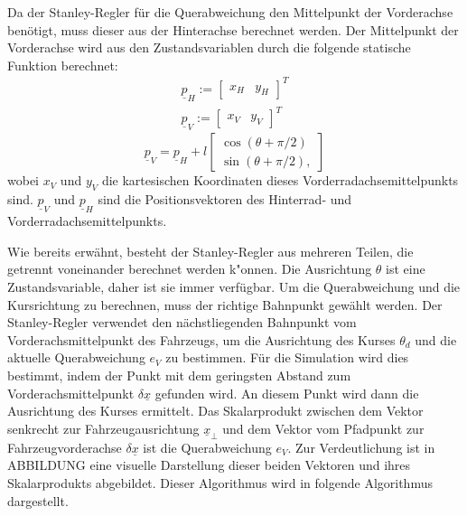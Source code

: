 \documentclass[arbeit=studie,oneside,BCOR=12mm]{ArbeitRST}
\begin{document}
Da der Stanley-Regler für die Querabweichung den Mittelpunkt der Vorderachse
benötigt, muss dieser aus der Hinterachse berechnet werden. Der Mittelpunkt der
Vorderachse wird aus den Zustandsvariablen durch die folgende statische
Funktion berechnet: 
\begin{gather}
  \underline{p}_H := 
  \begin{bmatrix}
    x_H & y_H
  \end{bmatrix}^T \\
  \underline{p}_V := 
  \begin{bmatrix}
    x_V & y_V
  \end{bmatrix}^T
  \label{eq:Rear Axle and Front Axle}
\end{gather}
\begin{equation}
  \underline{p}_V = \underline{p}_H + l 
  \begin{bmatrix}
    \cos(\theta + \pi/2) \\ 
    \sin(\theta + \pi/2),
  \end{bmatrix}
  \label{eq:Transformation from Rear Axle to Front Axle}
\end{equation}
wobei $x_V$ und $y_V$ die kartesischen Koordinaten dieses Vorderradachsemittelpunkts sind.
$\underline{p}_V$ und $\underline{p}_H$ sind die Positionsvektoren des
Hinterrad- und Vorderradachsemittelpunkts.

Wie bereits erwähnt, besteht der Stanley-Regler aus mehreren Teilen, die
getrennt voneinander berechnet werden k"onnen. Die Ausrichtung $\theta$ ist eine
Zustandsvariable, daher ist sie immer verfügbar. Um die Querabweichung und die
Kursrichtung zu berechnen, muss der richtige Bahnpunkt gewählt werden. Der
Stanley-Regler verwendet den nächstliegenden Bahnpunkt vom
Vorderachsmittelpunkt des Fahrzeugs, um die Ausrichtung des Kurses $\theta_d$
und die aktuelle Querabweichung $e_{V}$ zu bestimmen. Für die Simulation wird
dies bestimmt, indem der Punkt mit dem geringsten Abstand zum
Vorderachsmittelpunkt $\delta\underline{x}$ gefunden wird. An diesem Punkt wird
dann die Ausrichtung des Kurses ermittelt. Das Skalarprodukt zwischen dem
Vektor senkrecht zur Fahrzeugausrichtung $\underline{x}_{\perp}$ und dem Vektor
vom Pfadpunkt zur Fahrzeugvorderachse $\delta\underline{x}$ ist die
Querabweichung $e_{V}$. Zur Verdeutlichung ist in ABBILDUNG eine visuelle
Darstellung dieser beiden Vektoren und ihres Skalarprodukts abgebildet. Dieser
Algorithmus wird in folgende Algorithmus dargestellt. \\
\end{document}
